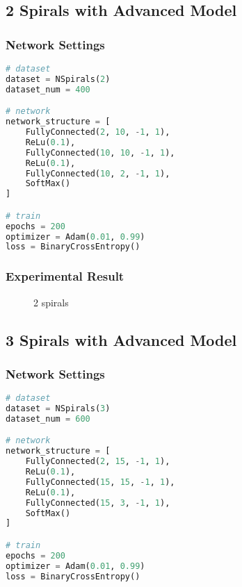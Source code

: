 \newpage
\subsection{2 Spirals with Advanced Model}
\subsubsection{Network Settings}
\begin{lstlisting}[language=Python]
# dataset
dataset = NSpirals(2)
dataset_num = 400

# network
network_structure = [
    FullyConnected(2, 10, -1, 1),
    ReLu(0.1),
    FullyConnected(10, 10, -1, 1),
    ReLu(0.1),
    FullyConnected(10, 2, -1, 1),
    SoftMax()
]

# train
epochs = 200
optimizer = Adam(0.01, 0.99)
loss = BinaryCrossEntropy()
\end{lstlisting}

\subsubsection{Experimental Result}
\begin{figure}[!ht]
    \centering
    \qquad
    \qquad
    \qquad
    \caption{2 spirals}
\end{figure}

\newpage
\subsection{3 Spirals with Advanced Model}
\subsubsection{Network Settings}
\begin{lstlisting}[language=Python]
# dataset
dataset = NSpirals(3)
dataset_num = 600

# network
network_structure = [
    FullyConnected(2, 15, -1, 1),
    ReLu(0.1),
    FullyConnected(15, 15, -1, 1),
    ReLu(0.1),
    FullyConnected(15, 3, -1, 1),
    SoftMax()
]

# train
epochs = 200
optimizer = Adam(0.01, 0.99)
loss = BinaryCrossEntropy()
\end{lstlisting}

